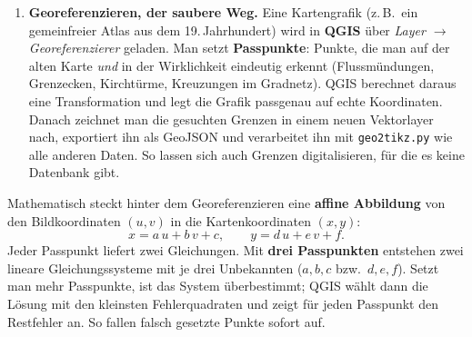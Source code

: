 \begin{enumerate}[resume, label=\textbf{(\arabic*)}]
	\item \textbf{Georeferenzieren, der saubere Weg.} Eine Kartengrafik (z.\,B.\ ein gemeinfreier Atlas aus dem 19.\,Jahrhundert) wird in \textbf{QGIS} über \textit{Layer $\to$ Georeferenzierer} geladen. Man setzt \textbf{Passpunkte}: Punkte, die man auf der alten Karte \textit{und} in der Wirklichkeit eindeutig erkennt (Flussmündungen, Grenzecken, Kirchtürme, Kreuzungen im Gradnetz). QGIS berechnet daraus eine Transformation und legt die Grafik passgenau auf echte Koordinaten. Danach zeichnet man die gesuchten Grenzen in einem neuen Vektorlayer nach, exportiert ihn als GeoJSON und verarbeitet ihn mit \texttt{geo2tikz.py} wie alle anderen Daten. So lassen sich auch Grenzen digitalisieren, für die es keine Datenbank gibt.
\end{enumerate}

Mathematisch steckt hinter dem Georeferenzieren eine \textbf{affine Abbildung} von den Bildkoordinaten $(u,v)$ in die Kartenkoordinaten $(x,y)$:
\[
	x = a\,u + b\,v + c, \qquad y = d\,u + e\,v + f .
\]
Jeder Passpunkt liefert zwei Gleichungen. Mit \textbf{drei Passpunkten} entstehen zwei lineare Gleichungssysteme mit je drei Unbekannten ($a,b,c$ bzw.\ $d,e,f$). Setzt man mehr Passpunkte, ist das System überbestimmt; QGIS wählt dann die Lösung mit den kleinsten Fehlerquadraten und zeigt für jeden Passpunkt den Restfehler an. So fallen falsch gesetzte Punkte sofort auf.


